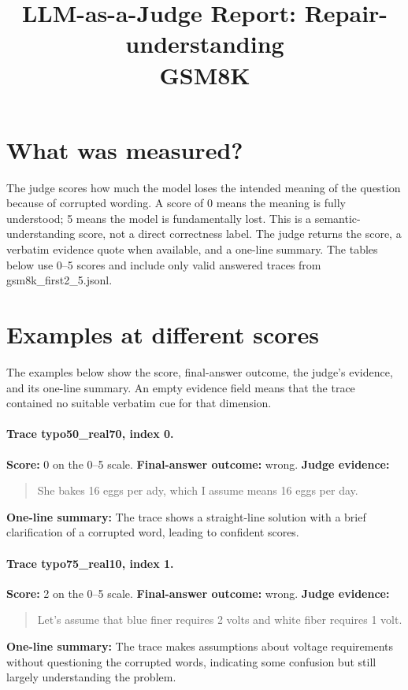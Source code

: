 \documentclass[11pt]{article}
\title{LLM-as-a-Judge Report: Repair-understanding\\\large GSM8K}
\date{}
\begin{document}
\maketitle

\section*{What was measured?} The judge scores how much the model loses the intended meaning of the question because of corrupted wording. A score of 0 means the meaning is fully understood; 5 means the model is fundamentally lost. This is a semantic-understanding score, not a direct correctness label. The judge returns the score, a verbatim evidence quote when available, and a one-line summary. The tables below use 0--5 scores and include only valid answered traces from gsm8k\_first2\_5.jsonl.

\section*{Examples at different scores} The examples below show the score, final-answer outcome, the judge's evidence, and its one-line summary. An empty evidence field means that the trace contained no suitable verbatim cue for that dimension.

\paragraph{Trace typo50\_real70, index 0.}
\textbf{Score:} 0 on the 0--5 scale. \textbf{Final-answer outcome:} wrong.
\textbf{Judge evidence:} \begin{quote}She bakes 16 eggs per ady, which I assume means 16 eggs per day.\end{quote}
\textbf{One-line summary:} The trace shows a straight-line solution with a brief clarification of a corrupted word, leading to confident scores.\medskip
\paragraph{Trace typo75\_real10, index 1.}
\textbf{Score:} 2 on the 0--5 scale. \textbf{Final-answer outcome:} wrong.
\textbf{Judge evidence:} \begin{quote}Let's assume that blue finer requires 2 volts and white fiber requires 1 volt.\end{quote}
\textbf{One-line summary:} The trace makes assumptions about voltage requirements without questioning the corrupted words, indicating some confusion but still largely understanding the problem.\medskip
\end{document}
